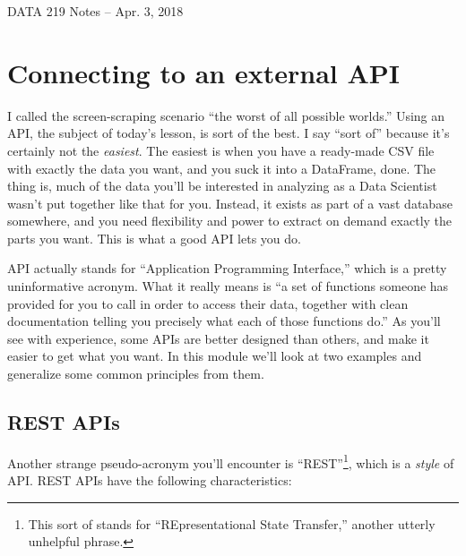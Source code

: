 \documentclass[12pt]{article}
\begin{document}
\begin{center}
\begin{Large}
DATA 219 Notes -- Apr. 3, 2018
\end{Large}
\end{center}

\section{Connecting to an external API}

I called the screen-scraping scenario ``the worst of all possible worlds.''
Using an API, the subject of today's lesson, is sort of the best. I say ``sort
of'' because it's certainly not the \textit{easiest}. The easiest is when you
have a ready-made CSV file with exactly the data you want, and you suck it
into a DataFrame, done. The thing is, much of the data you'll be interested in
analyzing as a Data Scientist wasn't put together like that for you. Instead,
it exists as part of a vast database somewhere, and you need flexibility and
power to extract on demand exactly the parts you want. This is what a good API
lets you do.

API actually stands for ``Application Programming Interface,'' which is a
pretty uninformative acronym. What it really means is ``a set of functions
someone has provided for you to call in order to access their data, together
with clean documentation telling you precisely what each of those functions
do.'' As you'll see with experience, some APIs are better designed than others,
and make it easier to get what you want. In this module we'll look at two
examples and generalize some common principles from them.

\subsection{REST APIs}

Another strange pseudo-acronym you'll encounter is ``REST''\footnote{This sort
of stands for ``REpresentational State Transfer,'' another utterly unhelpful
phrase.}, which is a \textit{style} of API. REST APIs have the following
characteristics:
\end{document}
